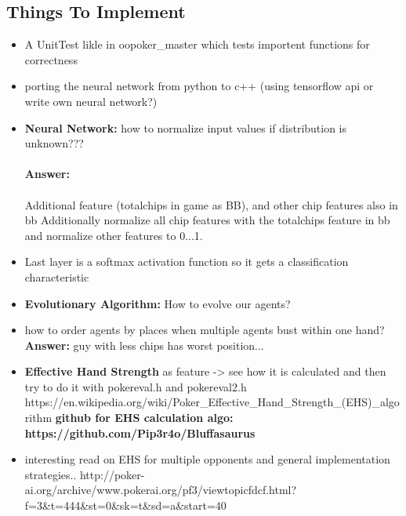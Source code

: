 \subsection{Things To Implement}
\begin{itemize}
\item A UnitTest likle in oopoker\_master which tests importent functions for correctness
\item porting the neural network from python to c++ (using tensorflow api or write own neural network?)
\item \textbf{Neural Network:} how to normalize input values if distribution is unknown???\\\\
\textbf{Answer:}\\\\
Additional feature (totalchips in game as BB), and other chip features also in bb
Additionally normalize all chip features with the totalchips feature in bb and normalize other features to 0...1. 
\item Last layer is a softmax activation function so it gets a classification characteristic
\item \textbf{Evolutionary Algorithm:} How to evolve our agents?
\item how to order agents by places when multiple agents bust within one hand?
\subitem \textbf{Answer:} guy with less chips has worst position...
\item \textbf{Effective Hand Strength} as feature -> see how it is calculated and then try to do it with pokereval.h and pokereval2.h
\subitem https://en.wikipedia.org/wiki/Poker\_Effective\_Hand\_Strength\_(EHS)\_algorithm
\subitem \textbf{github for EHS calculation algo: https://github.com/Pip3r4o/Bluffasaurus}
\item interesting read on EHS for multiple opponents and general implementation strategies.. 
http://poker-ai.org/archive/www.pokerai.org/pf3/viewtopicfdcf.html?f=3\&t=444\&st=0\&sk=t\&sd=a\&start=40
\end{itemize}

\pagebreak

